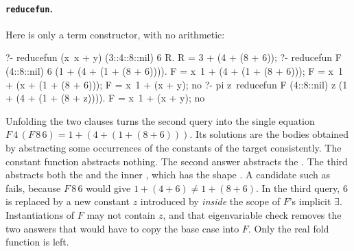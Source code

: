 \paragraph{\texttt{reducefun}.} Here \lp{+} is only a term constructor, with no arithmetic\newline{}:
\begin{lprolog}
?- reducefun (x\y\ x + y) (3::4::8::nil) 6 R.
R = 3 + (4 + (8 + 6));
?- reducefun F (4::8::nil) 6 (1 + (4 + (1 + (8 + 6)))).
F = x\y\ 1 + (4 + (1 + (8 + 6)));
F = x\y\ 1 + (x + (1 + (8 + 6)));
F = x\y\ 1 + (x + y);
no
?- pi z\ reducefun F (4::8::nil) z (1 + (4 + (1 + (8 + z)))).
F = x\y\ 1 + (x + y);
no
\end{lprolog}

\begin{tutorial}
Unfolding the two clauses turns the second query into the single equation
$F\,4\,(F\,8\,6) = 1+(4+(1+(8+6)))$. Its solutions are the bodies obtained by abstracting some occurrences
of the constants of the target consistently. The constant function abstracts nothing. The second answer
abstracts the . The third abstracts both the  and the inner , which has the
shape . A candidate such as  fails, because $F\,8\,6$ would give
$1+(4+6)\neq 1+(8+6)$. In the third query, $6$ is replaced by a new constant $z$ introduced by
 \emph{inside} the scope of $F$'s implicit $\exists$. Instantiations of $F$ may not contain $z$, and
that eigenvariable check removes the two answers that would have to copy the base case into $F$. Only the
real fold function is left.
\end{tutorial}

